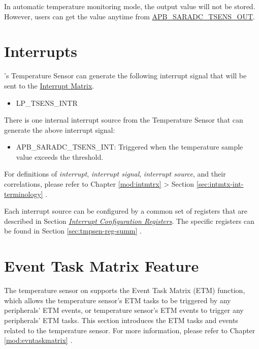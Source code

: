 \documentclass[main\_\_EN.tex]{subfiles}
\begin{document}
In automatic temperature monitoring mode, the output value will not be stored. However, users can get the value anytime from \hyperref[fielddesc:APBSARADCTSENSOUT]{APB\_SARADC\_TSENS\_OUT}.

\section{Interrupts}

\chipname{}'s Temperature Sensor can generate the following interrupt signal that will be sent to the \hyperref[mod:intmtrx]{Interrupt Matrix}.

    \begin{itemize}
        \item LP\_TSENS\_INTR
    \end{itemize}

There is one internal interrupt source from the Temperature Sensor that can generate the above interrupt signal:

    \begin{itemize}
        \item \label{int:APBSARADCTSENSINT} APB\_SARADC\_TSENS\_INT: Triggered when the temperature sample value exceeds the threshold.
    \end{itemize}

\begin{tiplisting}
For definitions of \textit{interrupt}, \textit{interrupt signal}, \textit{interrupt source}, and their correlations, please refer to Chapter \ref{mod:intmtrx} \textit{} > Section \ref{sec:intmtx-int-terminology} \textit{}.
\end{tiplisting}

Each interrupt source can be configured by a common set of registers that are described in Section \hyperref[interrupt-config-registers]{\textit{Interrupt Configuration Registers}}. The specific registers can be found in Section \ref{sec:tmpsen-reg-summ} \textit{}.


\section{Event Task Matrix Feature}
\label{sec:tmpsen-etm-func}

The temperature sensor on \chipname{} supports the Event Task Matrix (ETM) function, which allows the temperature sensor's ETM tasks to be triggered by any peripherals' ETM events, or temperature sensor's ETM events to trigger any peripherals' ETM tasks. This section introduces the ETM tasks and events related to the temperature sensor. For more information, please refer to Chapter \ref{mod:evntaskmatrix} \textit{}.
\end{document}
